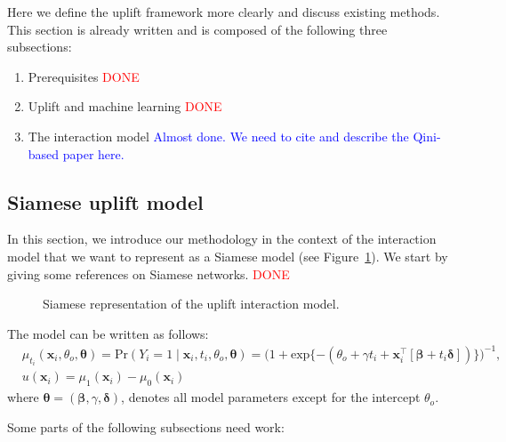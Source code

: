 \documentclass{article}
\def\x{\mathbf x}
\begin{document}
Here we define the uplift framework more clearly and discuss existing methods. This section is already written and is composed of the following three subsections:

\begin{enumerate}
    \item Prerequisites \textcolor{red}{DONE}
    \item Uplift and machine learning \textcolor{red}{DONE}
    \item The interaction model \textcolor{blue}{Almost done. We need to cite and describe the Qini-based paper here.}
\end{enumerate}


\subsection{Siamese uplift model}

In this section, we introduce our methodology in the context of the interaction model that we want to represent as a Siamese model (see Figure~\ref{fig:siamese_network}). We start by giving some references on Siamese networks. \textcolor{red}{DONE}

\begin{figure}[H]
    \centering
    
    \caption{Siamese representation of the uplift interaction model.}
    \label{fig:siamese_network}
\end{figure}

The model can be written as follows:
\begin{align*}
  &\mu_{t_i}(\x_i, \theta_o, \boldsymbol{\theta}) = \mathrm{Pr} (Y_i = 1 \mid \mathbf{x}_i, t_i, \theta_o, \boldsymbol{\theta}) =
  \bigl( 1+ \mathrm{exp}\{-(\theta_o + \gamma t_i + \mathbf{x}_i^\top [\boldsymbol{\beta} + t_i \boldsymbol{\delta}] ) \} \bigr)^{-1},\\
  &u(\x_i) = \mu_1(\x_i) - \mu_0(\x_i) 
\end{align*}
where $\boldsymbol{\theta} = (\boldsymbol{\beta}, \gamma, \boldsymbol{\delta})$, denotes all model parameters except for the intercept $\theta_o$.


Some parts of the following subsections need work:
\end{document}
